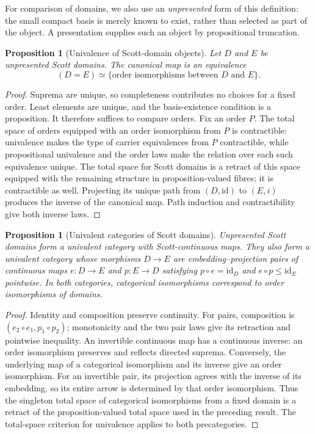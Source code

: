 \documentclass[11pt,a4paper]{article}
\newtheorem{proposition}[theorem]{Proposition}
\theoremstyle{definition}
\theoremstyle{remark}
\begin{document}
For comparison of domains, we also use an \emph{unpresented} form of this
definition: the small compact basis is merely known to exist, rather than
selected as part of the object. A presentation supplies such an object by
propositional truncation.
\begin{proposition}[Univalence of Scott-domain objects]
Let $D$ and $E$ be unpresented Scott domains. The canonical map is an
equivalence
\[
 (D=E)\simeq\{\text{order isomorphisms between $D$ and $E$}\}.
\]
\end{proposition}
\begin{proof}
Suprema are unique, so completeness contributes no choices for a fixed
order. Least elements are unique, and the basis-existence condition is a
proposition. It therefore suffices to compare orders. Fix an order $P$.
The total space of orders equipped with an order isomorphism from $P$ is
contractible: univalence makes the type of carrier equivalences from
$P$ contractible, while propositional univalence and the order laws make
the relation over each such equivalence unique. The total space for Scott
domains is a retract of this space equipped with the remaining structure
in proposition-valued fibres; it is contractible as well. Projecting its
unique path from $(D,\mathrm{id})$ to $(E,i)$ produces the inverse of the
canonical map. Path induction and contractibility give both inverse laws.
\end{proof}

\begin{proposition}[Univalent categories of Scott domains]
Unpresented Scott domains form a univalent category with Scott-continuous
maps. They also form a univalent category whose morphisms $D\to E$ are
embedding--projection pairs of continuous maps
$e:D\to E$ and $p:E\to D$ satisfying $p\circ e=\mathrm{id}_D$ and
$e\circ p\leq\mathrm{id}_E$ pointwise. In both categories, categorical
isomorphisms correspond to order isomorphisms of domains.
\end{proposition}
\begin{proof}
Identity and composition preserve continuity. For pairs, composition is
$(e_2\circ e_1,p_1\circ p_2)$; monotonicity and the two pair laws give its
retraction and pointwise inequality. An invertible continuous map has a
continuous inverse: an order isomorphism preserves and reflects directed
suprema. Conversely, the underlying map of a categorical isomorphism and
its inverse give an order isomorphism. For an invertible pair, its
projection agrees with the inverse of its embedding, so its entire arrow
is determined by that order isomorphism. Thus the singleton total space
of categorical isomorphisms from a fixed domain is a retract of the
proposition-valued total space used in the preceding result. The
total-space criterion for univalence applies to both precategories.
\end{proof}
\end{document}
